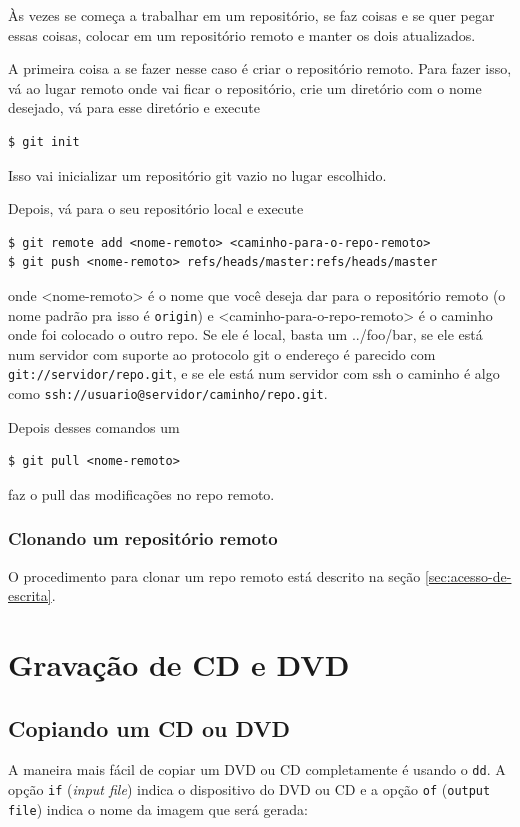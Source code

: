 \documentclass[12pt,brazil]{book}
\begin{document}
Às vezes se começa a trabalhar em um repositório, se faz coisas e se
quer pegar essas coisas, colocar em um repositório remoto e manter os
dois atualizados.

A primeira coisa a se fazer nesse caso é criar o repositório
remoto. Para fazer isso, vá ao lugar remoto onde vai ficar o
repositório, crie um diretório com o nome desejado, vá para esse
diretório e execute
\begin{verbatim}
$ git init
\end{verbatim}
Isso vai inicializar um repositório git vazio no lugar escolhido.

Depois, vá para o seu repositório local e execute
\begin{verbatim}
$ git remote add <nome-remoto> <caminho-para-o-repo-remoto>
$ git push <nome-remoto> refs/heads/master:refs/heads/master
\end{verbatim}
onde <nome-remoto> é o nome que você deseja dar para o repositório
remoto (o nome padrão pra isso é \texttt{origin}) e
<caminho-para-o-repo-remoto> é o caminho onde foi colocado o outro
repo. Se ele é local, basta um ../foo/bar, se ele está num servidor
com suporte ao protocolo git o endereço é parecido com
\texttt{git://servidor/repo.git}, e se ele está num servidor com ssh o
caminho é algo como \texttt{ssh://usuario@servidor/caminho/repo.git}.

Depois desses comandos um
\begin{verbatim}
$ git pull <nome-remoto>
\end{verbatim}
faz o pull das modificações no repo remoto.

\subsection{Clonando um repositório remoto}
\label{sec:clone}

O procedimento para clonar um repo remoto está descrito na seção
\ref{sec:acesso-de-escrita}.

\chapter{Gravação de CD e DVD}
\label{cha:gravacao-de-cd}

\section{Copiando um CD ou DVD}
\label{sec:copiando-um-cd}

A maneira mais fácil de copiar um DVD ou CD completamente é usando o
\texttt{dd}. A opção \texttt{if} (\textit{input file}) indica o
dispositivo do DVD ou CD e a opção \texttt{of} (\texttt{output file})
indica o nome da imagem que será gerada:
\end{document}
